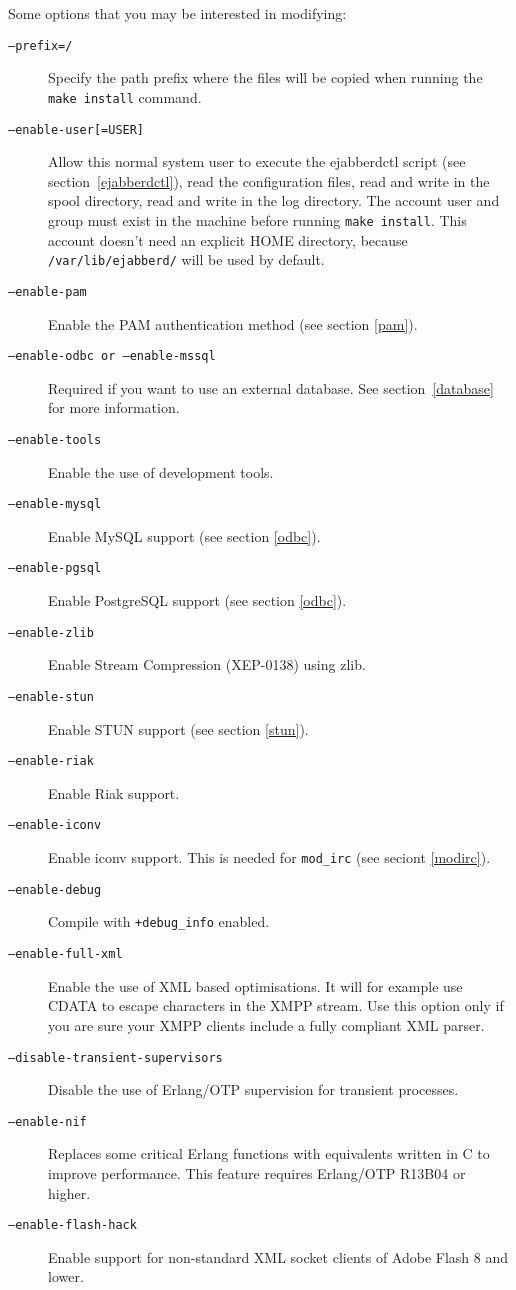 \documentclass[a4paper,10pt]{book}
\newcommand{\bracehack}{\def\{{\char"7B}\def\}{\char"7D}}
\newcommand{\titem}[1]{\item[\bracehack\texttt{#1}]}
\newcommand{\term}[1]{\texttt{#1}}
\begin{document}
Some options that you may be interested in modifying:
\begin{description}
	\titem{--prefix=/}
	Specify the path prefix where the files will be copied when running
	the \term{make install} command.

	\titem{--enable-user[=USER]}
	Allow this normal system user to execute the ejabberdctl script
	(see section~\ref{ejabberdctl}),
	read the configuration files,
	read and write in the spool directory,
	read and write in the log directory.
	The account user and group must exist in the machine
	before running \term{make install}.
	This account doesn't need an explicit HOME directory, because
	\term{/var/lib/ejabberd/} will be used by default.

	\titem{--enable-pam}
	Enable the PAM authentication method (see section \ref{pam}).

	\titem{--enable-odbc or --enable-mssql}
	Required if you want to use an external database.
	See section~\ref{database} for more information.

        \titem{--enable-tools}
        Enable the use of development tools.

        \titem{--enable-mysql}
        Enable MySQL support (see section \ref{odbc}).

        \titem{--enable-pgsql}
        Enable PostgreSQL support (see section \ref{odbc}).

        \titem{--enable-zlib}
        Enable Stream Compression (XEP-0138) using zlib.

        \titem{--enable-stun}
        Enable STUN support (see section \ref{stun}).

        \titem{--enable-riak}
        Enable Riak support.

        \titem{--enable-iconv}
        Enable iconv support. This is needed for \term{mod\_irc} (see seciont \ref{modirc}).

        \titem{--enable-debug}
        Compile with \term{+debug\_info} enabled.

	\titem{--enable-full-xml}
	Enable the use of XML based optimisations.
	It will for example use CDATA to escape characters in the XMPP stream.
	Use this option only if you are sure your XMPP clients include a fully compliant XML parser.

	\titem{--disable-transient-supervisors}
	Disable the use of Erlang/OTP supervision for transient processes.

	\titem{--enable-nif}
        Replaces some critical Erlang functions with equivalents written in C to improve performance.
        This feature requires Erlang/OTP R13B04 or higher.

	\titem{--enable-flash-hack}
	Enable support for non-standard XML socket clients of Adobe Flash 8 and lower.
\end{description}
\end{document}

